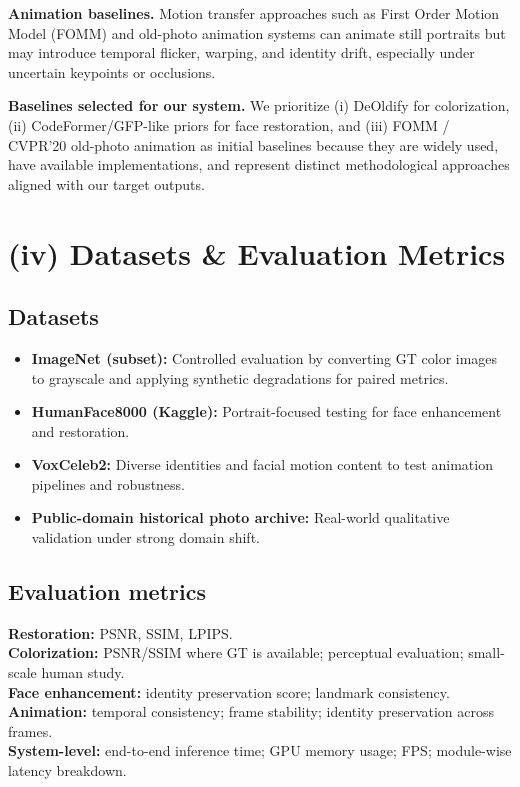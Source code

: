 \documentclass[10pt,twocolumn,letterpaper]{article}
\begin{document}
\textbf{Animation baselines.} Motion transfer approaches such as First Order Motion Model (FOMM) and old-photo animation systems can animate still portraits but may introduce temporal flicker, warping, and identity drift, especially under uncertain keypoints or occlusions.

\textbf{Baselines selected for our system.} We prioritize (i) DeOldify for colorization, (ii) CodeFormer/GFP-like priors for face restoration, and (iii) FOMM / CVPR'20 old-photo animation as initial baselines because they are widely used, have available implementations, and represent distinct methodological approaches aligned with our target outputs.

\section{(iv) Datasets \& Evaluation Metrics}
\subsection{Datasets}
\begin{itemize}[leftmargin=*]
  \item \textbf{ImageNet (subset):} Controlled evaluation by converting GT color images to grayscale and applying synthetic degradations for paired metrics.
  \item \textbf{HumanFace8000 (Kaggle):} Portrait-focused testing for face enhancement and restoration.
  \item \textbf{VoxCeleb2:} Diverse identities and facial motion content to test animation pipelines and robustness.
  \item \textbf{Public-domain historical photo archive:} Real-world qualitative validation under strong domain shift.
\end{itemize}

\subsection{Evaluation metrics}
\textbf{Restoration:} PSNR, SSIM, LPIPS.\\
\textbf{Colorization:} PSNR/SSIM where GT is available; perceptual evaluation; small-scale human study.\\
\textbf{Face enhancement:} identity preservation score; landmark consistency.\\
\textbf{Animation:} temporal consistency; frame stability; identity preservation across frames.\\
\textbf{System-level:} end-to-end inference time; GPU memory usage; FPS; module-wise latency breakdown.
\end{document}

